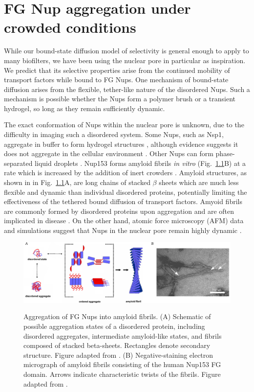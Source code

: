 \chapter{FG Nup aggregation under crowded conditions}\label{ch05}

While our bound-state diffusion model of selectivity is general enough to apply to many biofilters, we have been using the nuclear pore in particular as inspiration.  We predict that its selective properties arise from the continued mobility of transport factors while bound to FG Nups.  One mechanism of bound-state diffusion arises from the flexible, tether-like nature of the disordered Nups.  Such a mechanism is possible whether the Nups form a polymer brush or a transient hydrogel, so long as they remain sufficiently dynamic.

The exact conformation of Nups within the nuclear pore is unknown, due to the difficulty in imaging such a disordered system.  Some Nups, such as Nsp1, aggregate in buffer to form hydrogel structures \cite{frey06, frey07, ader10}, although evidence suggests it does not aggregate in the cellular environment \cite{hough15}.  Other Nups can form phase-separated liquid droplets \cite{schmidt15}.  Nup153 forms amyloid fibrils \textit{in vitro} (Fig.~\ref{fig:amyloid}B) at a rate which is increased by the addition of inert crowders \cite{milles13}.  Amyloid structures, as shown in in Fig.~\ref{fig:amyloid}A, are long chains of stacked $\beta$ sheets which are much less flexible and dynamic than individual disordered proteins, potentially limiting the effectiveness of the tethered bound diffusion of transport factors.  Amyoid fibrils are commonly formed by disordered proteins upon aggregation and are often implicated in disease \cite{jahn08}.    On the other hand, atomic force microscopy (AFM) data and simulations suggest that Nups in the nuclear pore remain highly dynamic \cite{sakiyama16,moussavi-baygi16}.

\begin{figure}
\caption[Aggregation of FG Nups into amyloid fibrils.]{Aggregation of FG Nups into amyloid fibrils. (A) Schematic of possible aggregation states of a disordered protein, including disordered aggregates, intermediate amyloid-like states, and fibrils composed of stacked beta-sheets. Rectangles denote secondary structure.  Figure adapted from \cite{jahn08}. (B) Negative-staining electron micrograph of amyloid fibrils consisting of the human Nup153 FG domain.  Arrows indicate characteristic twists of the fibrils.  Figure adapted from \cite{milles13}.}
\centering
\includegraphics[width=\textwidth]{figs/ch05/amyloid-intro}
\label{fig:amyloid}
\end{figure}

